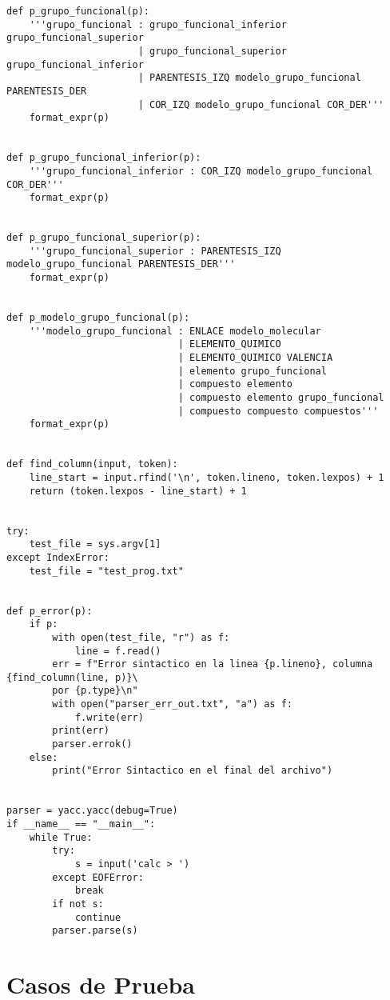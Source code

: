 \begin{verbatim}
def p_grupo_funcional(p):
    '''grupo_funcional : grupo_funcional_inferior grupo_funcional_superior
                       | grupo_funcional_superior grupo_funcional_inferior
                       | PARENTESIS_IZQ modelo_grupo_funcional PARENTESIS_DER
                       | COR_IZQ modelo_grupo_funcional COR_DER'''
    format_expr(p)


def p_grupo_funcional_inferior(p):
    '''grupo_funcional_inferior : COR_IZQ modelo_grupo_funcional COR_DER'''
    format_expr(p)


def p_grupo_funcional_superior(p):
    '''grupo_funcional_superior : PARENTESIS_IZQ modelo_grupo_funcional PARENTESIS_DER'''
    format_expr(p)


def p_modelo_grupo_funcional(p):
    '''modelo_grupo_funcional : ENLACE modelo_molecular
                              | ELEMENTO_QUIMICO
                              | ELEMENTO_QUIMICO VALENCIA
                              | elemento grupo_funcional
                              | compuesto elemento
                              | compuesto elemento grupo_funcional
                              | compuesto compuesto compuestos'''
    format_expr(p)


def find_column(input, token):
    line_start = input.rfind('\n', token.lineno, token.lexpos) + 1
    return (token.lexpos - line_start) + 1


try:
    test_file = sys.argv[1]
except IndexError:
    test_file = "test_prog.txt"


def p_error(p):
    if p:
        with open(test_file, "r") as f:
            line = f.read()
        err = f"Error sintactico en la linea {p.lineno}, columna {find_column(line, p)}\
        por {p.type}\n"
        with open("parser_err_out.txt", "a") as f:
            f.write(err)
        print(err)
        parser.errok()
    else:
        print("Error Sintactico en el final del archivo")


parser = yacc.yacc(debug=True)
if __name__ == "__main__":
    while True:
        try:
            s = input('calc > ')
        except EOFError:
            break
        if not s:
            continue
        parser.parse(s)

\end{verbatim}

\label{apendixB}

\chapter{Casos de Prueba}

